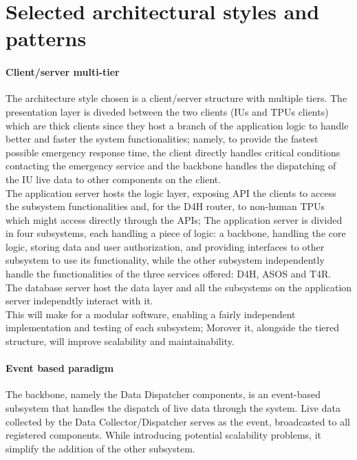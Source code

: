 \section{Selected architectural styles and patterns}
\paragraph{Client/server multi-tier}
The architecture style chosen is a client/server structure with multiple tiers. The presentation layer is diveded between the two clients (IUs and TPUs clients) which are thick clients since they host a branch of the application logic to handle better and faster the system functionalities; namely, to provide the fastest possible emergency response time, the client directly handles critical conditions contacting the emergency service and the backbone handles the dispatching of the IU live data to other components on the client. \\
The application server hosts the logic layer, exposing API the clients to access the subsystem functionalities and, for the D4H router, to non-human TPUs which might access directly through the APIs; The application server is divided in four subsystems, each handling a piece of logic: a backbone, handling the core logic, storing data and user authorization, and providing interfaces to other subsystem to use its functionality, while the other subsystem independently handle the functionalities of the three services offered: D4H, ASOS and T4R. \\
The database server host the data layer and all the subsystems on the application server independtly interact with it.
\\
This will make for a modular software, enabling a fairly independent implementation and testing of each subsystem; Morover it, alongside the tiered structure, will improve scalability and maintainability.

\paragraph{Event based paradigm}
The backbone, namely the Data Dispatcher components, is an event-based subsystem that handles the dispatch of live data through the system. Live data collected by the Data Collector/Dispatcher serves as the event, broadcasted to all registered components. While introducing potential scalability problems, it simplify the addition of the other subsystem.
